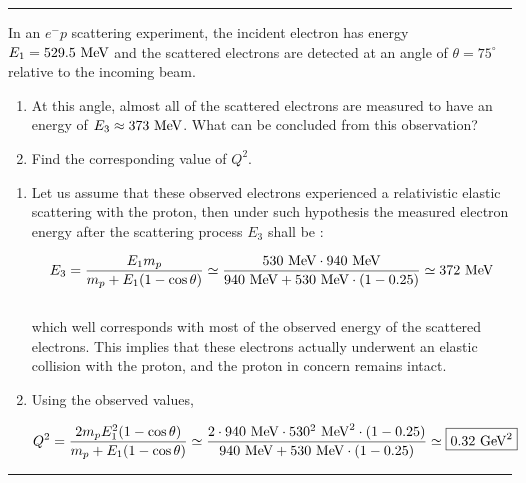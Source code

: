 \noindent\rule{7in}{1.5pt}


\begin{problem}{7.3}
    In an $e^-p$ scattering experiment, the incident electron has energy $E_1 = 529.5 \text{ MeV}$ and the scattered electrons are detected at an angle of $\theta = 75^\circ$ relative to the incoming beam.
    \begin{enumerate}[label=(\alph*)]
        \item At this angle, almost all of the scattered electrons are measured to have an energy of $E_3 \approx 373 \text{ MeV}$. What can be concluded from this observation?
        \item Find the corresponding value of $Q^2$.
    \end{enumerate}
\end{problem}
\begin{solution}
\begin{enumerate}[label=(\alph*)]
    \item Let us assume that these observed electrons experienced a relativistic elastic scattering with the proton, then under such hypothesis the measured electron energy after the scattering process $E_3$ shall be :
    
    \begin{align*}
        E_3 = \frac{E_1 m_p}{m_p + E_1 (1-\cos\theta)} \simeq \frac{530\text{ MeV} \cdot 940 \text{ MeV}}{940 \text{ MeV} + 530 \text{ MeV} \cdot (1-0.25)} \simeq 372 \text{ MeV}
    \end{align*}\\
    which well corresponds with most of the observed energy of the scattered electrons. This implies that these electrons actually underwent an elastic collision with the proton, and the proton in concern remains intact.

    \item Using the observed values, 
    
    \begin{align*}
        Q^2 = \frac{2m_p E_1^2(1-\cos\theta)}{m_p + E_1 (1-\cos\theta)} \simeq \frac{2\cdot 940 \text{ MeV} \cdot 530^2 \text{ MeV}^2 \cdot (1-0.25)}{940 \text{ MeV} + 530 \text{ MeV} \cdot (1-0.25)} \simeq \boxed{0.32 \text{ GeV}^2}
    \end{align*}
\end{enumerate}
\end{solution}

\noindent\rule{7in}{1.5pt}

